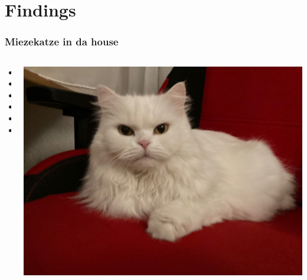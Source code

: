 \documentclass[ngerman]{beamer}
\begin{document}
\section{Findings}
\begin{frame}
\frametitle{Miezekatze in da house}

\begin{columns}
\begin{column}{0.49\textwidth}
\begin{itemize}
	\item 
	\item 
	\item 
	\item 
	\item 
	\item 
\end{itemize}
\end{column}
\begin{column}{0.49\textwidth}
\includegraphics[width=\textwidth]{Bilder/Katze2}
\end{column}
\end{columns}

\end{frame}
\end{document}
